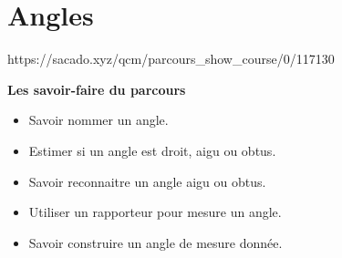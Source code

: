 \chapter{Angles}
{https://sacado.xyz/qcm/parcours_show_course/0/117130}
{
\begin{CpsCol}
 \textbf{Les savoir-faire du parcours}
\begin{itemize}
\item Savoir nommer un angle.
\item Estimer si un angle est droit, aigu ou obtus.   
\item Savoir reconnaitre un angle aigu ou obtus.   
\item Utiliser un rapporteur pour mesure un angle.
\item Savoir construire un angle de mesure donnée.
\end{itemize}
\end{CpsCol}
}




